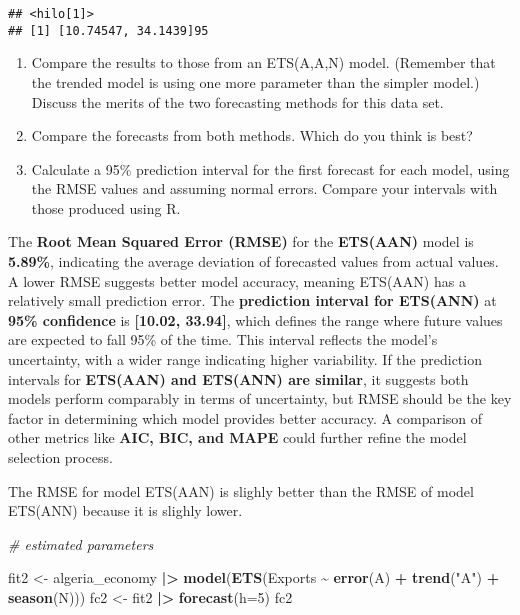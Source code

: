 \documentclass[
]{article}
\newenvironment{Shaded}{\begin{snugshade}}{\end{snugshade}}
\newcommand{\AttributeTok}[1]{\textcolor[rgb]{0.13,0.29,0.53}{#1}}
\newcommand{\CommentTok}[1]{\textcolor[rgb]{0.56,0.35,0.01}{\textit{#1}}}
\newcommand{\DecValTok}[1]{\textcolor[rgb]{0.00,0.00,0.81}{#1}}
\newcommand{\FunctionTok}[1]{\textcolor[rgb]{0.13,0.29,0.53}{\textbf{#1}}}
\newcommand{\NormalTok}[1]{#1}
\newcommand{\OtherTok}[1]{\textcolor[rgb]{0.56,0.35,0.01}{#1}}
\newcommand{\SpecialCharTok}[1]{\textcolor[rgb]{0.81,0.36,0.00}{\textbf{#1}}}
\newcommand{\StringTok}[1]{\textcolor[rgb]{0.31,0.60,0.02}{#1}}
\providecommand{\tightlist}{%
  \setlength{\itemsep}{0pt}\setlength{\parskip}{0pt}}
\begin{document}
\begin{verbatim}
## <hilo[1]>
## [1] [10.74547, 34.1439]95
\end{verbatim}

\begin{enumerate}
\def\labelenumi{\alph{enumi}.}
\setcounter{enumi}{3}
\tightlist
\item
  Compare the results to those from an ETS(A,A,N) model. (Remember that
  the trended model is using one more parameter than the simpler model.)
  Discuss the merits of the two forecasting methods for this data set.
\item
  Compare the forecasts from both methods. Which do you think is best?
\item
  Calculate a 95\% prediction interval for the first forecast for each
  model, using the RMSE values and assuming normal errors. Compare your
  intervals with those produced using R.
\end{enumerate}

The \textbf{Root Mean Squared Error (RMSE)} for the \textbf{ETS(AAN)}
model is \textbf{5.89\%}, indicating the average deviation of forecasted
values from actual values. A lower RMSE suggests better model accuracy,
meaning ETS(AAN) has a relatively small prediction error. The
\textbf{prediction interval for ETS(ANN)} at \textbf{95\% confidence} is
\textbf{{[}10.02, 33.94{]}}, which defines the range where future values
are expected to fall 95\% of the time. This interval reflects the
model's uncertainty, with a wider range indicating higher variability.
If the prediction intervals for \textbf{ETS(AAN) and ETS(ANN) are
similar}, it suggests both models perform comparably in terms of
uncertainty, but RMSE should be the key factor in determining which
model provides better accuracy. A comparison of other metrics like
\textbf{AIC, BIC, and MAPE} could further refine the model selection
process.

The RMSE for model ETS(AAN) is slighly better than the RMSE of model
ETS(ANN) because it is slighly lower.

\begin{Shaded}
\begin{Highlighting}[]
\CommentTok{\# estimated parameters }

\NormalTok{fit2 }\OtherTok{\textless{}{-}}\NormalTok{ algeria\_economy }\SpecialCharTok{|\textgreater{}} 
  \FunctionTok{model}\NormalTok{(}\FunctionTok{ETS}\NormalTok{(Exports }\SpecialCharTok{\textasciitilde{}} \FunctionTok{error}\NormalTok{(}\StringTok{\textquotesingle{}A\textquotesingle{}}\NormalTok{) }\SpecialCharTok{+} \FunctionTok{trend}\NormalTok{(}\StringTok{"A"}\NormalTok{) }\SpecialCharTok{+} \FunctionTok{season}\NormalTok{(}\StringTok{\textquotesingle{}N\textquotesingle{}}\NormalTok{)))}
\NormalTok{fc2 }\OtherTok{\textless{}{-}}\NormalTok{ fit2 }\SpecialCharTok{|\textgreater{}} 
  \FunctionTok{forecast}\NormalTok{(}\AttributeTok{h=}\DecValTok{5}\NormalTok{)}
\NormalTok{fc2}
\end{Highlighting}
\end{Shaded}
\end{document}
